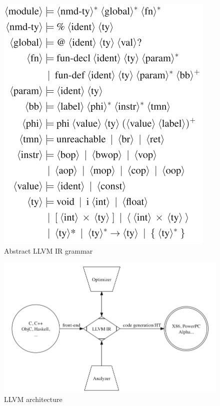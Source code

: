 \documentclass[14pt]{article}
\begin{document}
\begin{figure}[htb!]
  \begin{centering}
    \includegraphics[scale=0.5]{figures/llvm_ir_grammar}\par
  \end{centering}
  \caption{Abstract LLVM IR grammar}
  \label{fig:llvm_ir_grammar}
\end{figure}

\begin{figure}[htb!]
  \begin{centering}
    \includegraphics[scale=0.5]{figures/llvm_architecture}\par
  \end{centering}
  \caption{LLVM architecture}
  \label{fig:llvm_architecture}
\end{figure}
\end{document}
